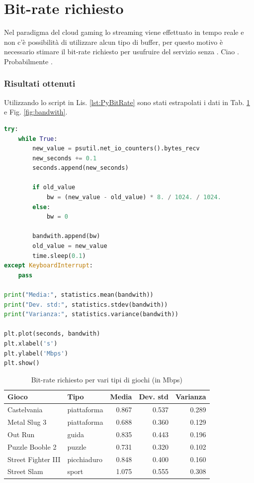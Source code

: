 \section{Bit-rate richiesto}
Nel paradigma del cloud gaming lo streaming viene effettuato in tempo reale e non c'è possibilità di utilizzare alcun tipo di buffer, per questo motivo è necessario stimare il bit-rate richiesto per usufruire del servizio senza \parencite{Network_Analysis_of_the_Sony_Remote_Play_System}. Ciao \parencite{StreamingMobileCloudGamingVideoOverTCPWithAdaptiveSourceFECCoding}. Probabilmente \parencite{ChenKuanTa2014OtQo}.

\subsubsection{Risultati ottenuti}
Utilizzando lo script in Lis. \ref{lst:PyBitRate} sono stati estrapolati i dati in Tab. \ref{table:bandwith_e_medie} e Fig. \ref{fig:bandwith}.

\begin{lstlisting}[language=Python, caption=Script Python per il calcolo del bit-rate richiesto, label={lst:PyBitRate}]
try:
	while True:
		new_value = psutil.net_io_counters().bytes_recv
		new_seconds += 0.1
		seconds.append(new_seconds)

		if old_value
			bw = (new_value - old_value) * 8. / 1024. / 1024.
		else:
			bw = 0

		bandwith.append(bw)
		old_value = new_value
		time.sleep(0.1)
except KeyboardInterrupt:
	pass

print("Media:", statistics.mean(bandwith))
print("Dev. std:", statistics.stdev(bandwith))
print("Varianza:", statistics.variance(bandwith))

plt.plot(seconds, bandwith)
plt.xlabel('s')
plt.ylabel('Mbps')
plt.show()
\end{lstlisting}

\begin{table}[H]
	\centering
	\begin{tabular}{||l l r r r||}
		\hline
		Gioco & Tipo & Media & Dev. std & Varianza \\
		\hline\hline
		\hline
		Castelvania & piattaforma & 0.867 & 0.537 & 0.289 \\
		\hline		
		Metal Slug 3 & piattaforma & 0.688 & 0.360 & 0.129 \\
		\hline
		Out Run & guida & 0.835 & 0.443 & 0.196 \\
		\hline
		Puzzle Booble 2 & puzzle & 0.731 & 0.320 & 0.102 \\
		\hline
		Street Fighter III & picchiaduro & 0.848 & 0.400 & 0.160 \\
		\hline	
		Street Slam & sport & 1.075 & 0.555 & 0.308 \\
		\hline
	\end{tabular}

	\caption{Bit-rate richiesto per vari tipi di giochi (in Mbps)}
	\label{table:bandwith_e_medie}
\end{table}

